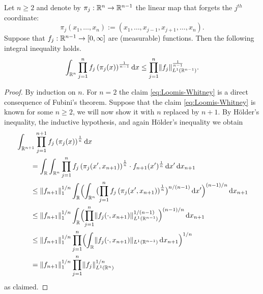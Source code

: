 \begin{theorem}\label{thm:Loomis-Whitney}
Let $n\geq 2$ and denote by $\pi_j: \mathbb{R}^n \rightarrow \mathbb{R}^{n-1}$ the linear map that forgets the $j^{th}$ coordinate:
\[
\pi_j( x_1, \dotsc, x_n) := (x_1, \dotsc, x_{j-1}, x_{j+1}, \dotsc, x_n).
\]
Suppose that $f_j: \mathbb{R}^{n-1} \to [0,\infty]$ are (measurable) functions.
Then the following integral inequality holds.
\begin{equation}\label{eq:Loomis-Whitney}
\int_{\mathbb{R}^n} \prod_{j=1}^n f_j \left( \pi_j(x) \right)^{\frac{1}{n-1}} \mathop{}\!\mathrm{d} x
\le
\prod_{j=1}^n \lVert f_j \rVert_{L^1(\mathbb{R}^{n-1})}^{\frac{1}{n-1}}.
\end{equation}
\end{theorem}
\begin{proof}
By induction on $n$.
For $n=2$ the claim \eqref{eq:Loomis-Whitney} is a direct consequence of Fubini's theorem.
Suppose that the claim \eqref{eq:Loomis-Whitney} is known for some $n\geq 2$, we will now show it with $n$ replaced by $n+1$.
By H\"older's inequality, the inductive hypothesis, and again H\"older's inequality we obtain
\begin{align*}
\MoveEqLeft
\int_{\R^{n+1}} \prod_{j=1}^{n+1} f_j \left( \pi_j(x) \right)^{\frac{1}{n}} \dif x\\
&=
\int_{\R} \int_{\R^{n}} \prod_{j=1}^{n} f_j \left( \pi_j(x',x_{n+1}) \right)^{\frac{1}{n}} \cdot f_{n+1}(x')^{\frac{1}{n}} \dif x' \dif x_{n+1}\\
&\leq
\norm{f_{n+1}}_{1}^{1/n} \int_{\R} \Bigl( \int_{\R^{n}} \bigl( \prod_{j=1}^{n} f_j \left( \pi_j(x',x_{n+1}) \right)^{\frac{1}{n}} \bigr)^{n/(n-1)} \dif x' \Bigr)^{(n-1)/n} \dif x_{n+1}\\
&\leq
\norm{f_{n+1}}_{1}^{1/n} \int_{\R} \Bigl( \prod_{j=1}^{n} \norm{ f_j(\cdot,x_{n+1}) }_{L^{1}(\R^{n-1})}^{1/(n-1)} \Bigr)^{(n-1)/n} \dif x_{n+1}\\
&\leq
\norm{f_{n+1}}_{1}^{1/n} \prod_{j=1}^{n} \Bigl(\int_{\R} \norm{ f_j(\cdot,x_{n+1}) }_{L^{1}(\R^{n-1})} \dif x_{n+1} \Bigr)^{1/n}\\
&=
\norm{f_{n+1}}_{1}^{1/n} \prod_{j=1}^{n} \norm{ f_j }_{L^{1}(\R^{n})}^{1/n}
\end{align*}
as claimed.
\end{proof}

